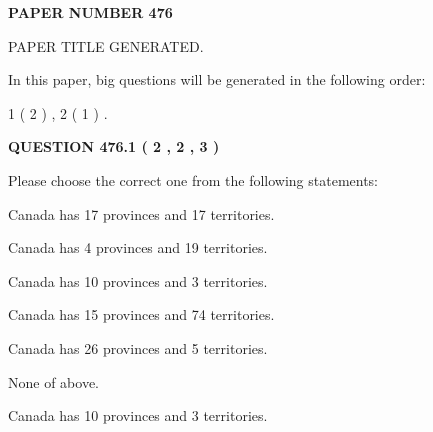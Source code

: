 \documentclass[12pt]{article}
\begin{document}
   
   
   
\newpage 
\setcounter{page}{ 
   476001 } 
   
   
   
   
 {\textbf{ \Large{ PAPER NUMBER  476  }}}
   
   
\vspace{0.2in}
   
   
   
   
   
   
   
   
 \vspace{0.2in}
 
 
 
 
   
   
 PAPER TITLE GENERATED.
   
   
   
\vspace{0.2in}
   
In this paper, big questions will be generated in the following order: 
   
   
   1 ( 2 )
 ,
   2 ( 1 )
 .
  
\vspace{0.2in}
  
{\textbf{\Large{QUESTION
476.1 
 ( 2 , 2 , 3 )
}}}
  
  
Please choose the correct one from the following statements:
 
 
Canada has  17 provinces and  17 territories.
 
 
Canada has   4 provinces and  19 territories.
 
 
Canada has 10  provinces and 3 territories.
 
 
Canada has  15 provinces and  74 territories.
 
 
Canada has  26 provinces and  5 territories.
 
 
 None of above.
 
 
\noindent{}
 
 
Canada has 10  provinces and 3 territories.
 
 
\noindent{}
 
\end{document}
